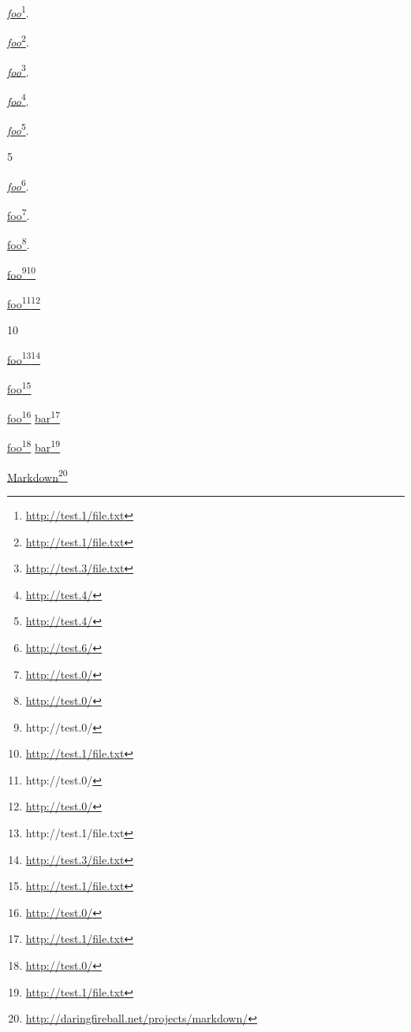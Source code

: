 
\def\mytitle{Reference Links}


\href{http://test.1/file.txt}{\emph{foo}}\footnote{\href{http://test.1/file.txt}{http:\slash \slash test.1\slash file.txt}}.

\href{http://test.1/file.txt}{\emph{foo}}\footnote{\href{http://test.1/file.txt}{http:\slash \slash test.1\slash file.txt}}.

\href{http://test.3/file.txt}{\emph{foo}}\footnote{\href{http://test.3/file.txt}{http:\slash \slash test.3\slash file.txt}}.

\href{http://test.4/}{\emph{foo}}\footnote{\href{http://test.4/}{http:\slash \slash test.4\slash }}.

\href{http://test.4/}{\emph{foo}}\footnote{\href{http://test.4/}{http:\slash \slash test.4\slash }}.

5

\href{http://test.6/}{\emph{foo}}\footnote{\href{http://test.6/}{http:\slash \slash test.6\slash }}.

\href{http://test.0/}{foo}\footnote{\href{http://test.0/}{http:\slash \slash test.0\slash }}.

\href{http://test.0/}{foo}\footnote{\href{http://test.0/}{http:\slash \slash test.0\slash }}.

\href{http://test.1/file.txt}{\href{http://test.0/}{foo}\footnote{\href{http://test.0/}{http:\slash \slash test.0\slash }}}\footnote{\href{http://test.1/file.txt}{http:\slash \slash test.1\slash file.txt}}

\href{http://test.0/}{\href{http://test.0/}{foo}\footnote{\href{http://test.0/}{http:\slash \slash test.0\slash }}}\footnote{\href{http://test.0/}{http:\slash \slash test.0\slash }}

10

\href{http://test.3/file.txt}{\href{http://test.1/file.txt}{foo}\footnote{\href{http://test.1/file.txt}{http:\slash \slash test.1\slash file.txt}}}\footnote{\href{http://test.3/file.txt}{http:\slash \slash test.3\slash file.txt}}

\href{http://test.1/file.txt}{foo}\footnote{\href{http://test.1/file.txt}{http:\slash \slash test.1\slash file.txt}}

\href{http://test.0/}{foo}\footnote{\href{http://test.0/}{http:\slash \slash test.0\slash }} \href{http://test.1/file.txt}{bar}\footnote{\href{http://test.1/file.txt}{http:\slash \slash test.1\slash file.txt}}

\href{http://test.0/}{foo}\footnote{\href{http://test.0/}{http:\slash \slash test.0\slash }}
\href{http://test.1/file.txt}{bar}\footnote{\href{http://test.1/file.txt}{http:\slash \slash test.1\slash file.txt}}

\href{http://daringfireball.net/projects/markdown/}{Markdown}\footnote{\href{http://daringfireball.net/projects/markdown/}{http:\slash \slash daringfireball.net\slash projects\slash markdown\slash }}



